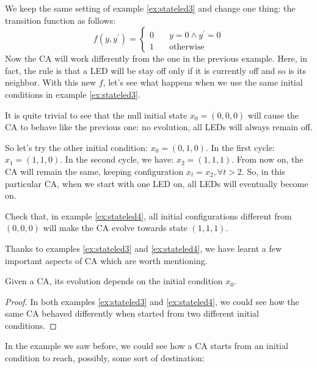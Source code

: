 \begin{example}
\label{ex:stateled4}
We keep the same setting of example \ref{ex:stateled3} and change one thing: the transition function
as follows:
\begin{equation*}
f \left( y, y^\prime \right) =
  \begin{cases}
    0       & \quad y = 0 \wedge y^\prime = 0\\
    1       & \quad \text{otherwise}
  \end{cases}
\end{equation*}
Now the CA will work differently from the one in the previous example. Here, in fact, the rule is
that a LED will be stay off only if it is currently off and so is its neighbor. With this
new $f$, let's see what happens when we use the same initial conditions in example \ref{ex:stateled3}.

It is quite trivial to see that the null initial state $x_0 = (0,0,0)$ will cause the CA to behave
like the previous one: no evolution, all LEDs will always remain off.

So let's try the other initial condition: $x_0 = (0,1,0)$. In the first cycle: $x_1 = (1,1,0)$.
In the second cycle, we have: $x_2 = (1,1,1)$. From now on, the CA will remain the same, keeping
configuration $x_t = x_2, \forall t > 2$. So, in this particular CA, when we start with one LED on,
all LEDs will eventually become on.
\end{example}

\begin{problem}
Check that, in example \ref{ex:stateled4}, all initial configurations different from $(0,0,0)$ will
make the CA evolve towards state $(1,1,1)$.
\end{problem}

Thanks to examples \ref{ex:stateled3} and \ref{ex:stateled4}, we have learnt a few important
aspects of CA which are worth mentioning.

\begin{theorem}
\label{theo:evinitcond}
Given a CA, its evolution depends on the initial condition $x_0$.
\begin{proof}
In both examples \ref{ex:stateled3} and \ref{ex:stateled4}, we could see how the same CA behaved
differently when started from two different initial conditions.
\end{proof}
\end{theorem}

In the example we saw before, we could see how a CA starts from an initial condition 
to reach, possibly, some sort of destination:

